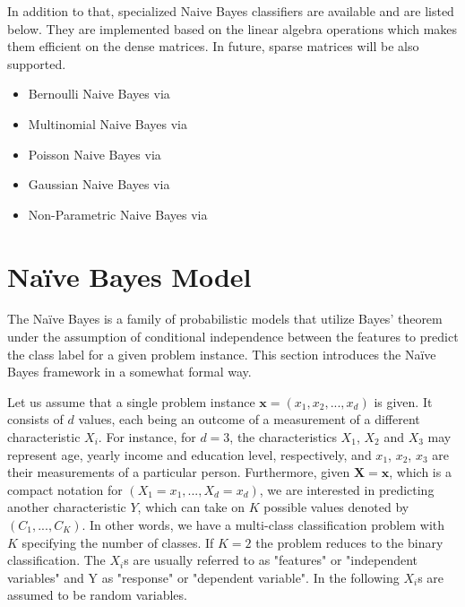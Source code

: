 \documentclass{article}\usepackage[]{graphicx}\usepackage[]{color}
\begin{document}
\vspace{2mm}
In addition to that, specialized Naive Bayes classifiers are available and are listed below. They are implemented based on the linear algebra operations which makes them efficient on the dense matrices. In future, sparse matrices will be also supported.

\begin{itemize}
 \item Bernoulli Naive Bayes via \textcolor{darkgreen}{{}}
 \item Multinomial Naive Bayes via \textcolor{darkgreen}{{}}
 \item Poisson Naive Bayes via \textcolor{darkgreen}{{}}
 \item Gaussian Naive Bayes via \textcolor{darkgreen}{{}}
 \item Non-Parametric Naive Bayes via \textcolor{darkgreen}{{}}
\end{itemize}


\section{Na\"ive Bayes Model}

The Na\"ive Bayes is a family of probabilistic models that utilize Bayes' theorem under the assumption of conditional independence between the features to predict the class label for a given problem instance. This section introduces the Na\"ive Bayes framework in a somewhat formal way.

Let us assume that a single problem instance $\boldsymbol{x} = (x_1, x_2, ..., x_d)$ is given. It consists of $d$ values, each being an outcome of a measurement of a different characteristic $X_i$. For instance, for $d=3$, the characteristics $X_1$, $X_2$ and $X_3$ may represent age, yearly income and education level, respectively, and $x_1$, $x_2$, $x_3$ are their measurements of a particular person. Furthermore, given $\boldsymbol{X} = \boldsymbol{x}$, which is a compact notation for $(X_1 = x_1,...,X_d = x_d)$, we are interested in predicting another characteristic $Y$, which can take on $K$ possible values denoted by $(C_1,...,C_K)$. In other words, we have a multi-class classification problem with $K$ specifying the number of classes. If $K=2$ the problem reduces to the binary classification. The $X_i$s are usually referred to as "features" or "independent variables" and Y as "response" or "dependent variable". In the following $X_i$s are assumed to be random variables.
\end{document}
